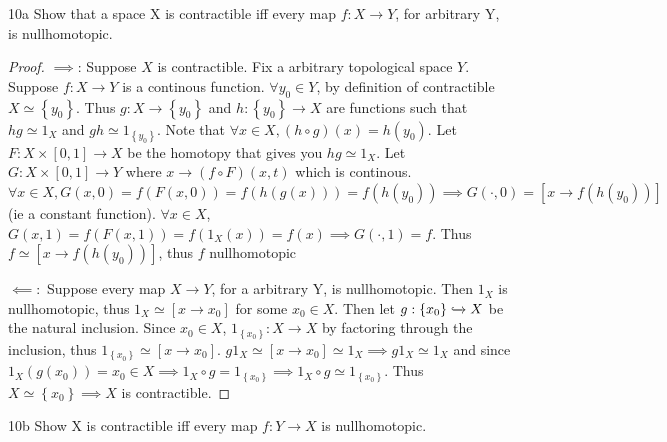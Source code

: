 \documentclass{article}
\begin{document}
\begin{claim}{10a}\label{Claim 10a.}
    Show that a space X is contractible iﬀ every map $f: X \to Y$, for arbitrary Y, is nullhomotopic.
\end{claim}
\begin{proof}
    $\implies$: Suppose $X$ is contractible. Fix a arbitrary topological space $Y$. Suppose $f: X \to Y$ is a continous function. $\forall y_0 \in Y$, by definition of contractible $X \simeq \left\{ y_0 \right\}$. Thus $g: X \to \left\{ y_0 \right\}$ and $h: \left\{ y_0 \right\} \to X$ are functions such that $hg \simeq 1_X$ and $gh \simeq 1_{\left\{ y_0 \right\}}$. Note that $\forall x \in X, (h \circ g)(x) = h(y_0)$. Let $F: X \times [0, 1] \to X$ be the homotopy that gives you $hg \simeq 1_X$. Let $G: X \times [0, 1] \to Y$ where $x \to (f \circ F)(x, t)$ which is continous. $\forall x \in X, G(x, 0) = f(F(x, 0)) = f(h(g(x))) = f(h(y_0)) \implies G(\cdot, 0) = [x \to  f(h(y_0))]$ (ie a constant function). $\forall x \in X$, $G(x, 1) = f(F(x, 1)) = f(1_X(x)) = f(x) \implies G(\cdot, 1) = f$. Thus $f \simeq [x \to  f(h(y_0))]$, thus $f$ nullhomotopic
    
    $\impliedby:$ Suppose every map $X \to Y$, for a arbitrary Y, is nullhomotopic. Then $1_X$ is nullhomotopic, thus $1_X \simeq [x \to x_0]$ for some $x_0 \in X$. Then let $g: \left\{ x_0 \right\} \xhookrightarrow{} X$ be the natural inclusion. Since $x_0 \in X$, $1_{\left\{ x_0 \right\}} : X \to X$ by factoring through the inclusion, thus $1_{\left\{ x_0 \right\}} \simeq [x \to x_0]$. $g 1_X \simeq [x \to x_0] \simeq 1_X \implies g 1_X \simeq 1_X$ and since $1_X(g(x_0)) = x_0 \in X \implies 1_X \circ g = 1_{\left\{ x_0 \right\}} \implies 1_X \circ g \simeq 1_{\left\{ x_0 \right\}}$. Thus $X \simeq \left\{ x_0 \right\} \implies X$ is contractible.        
\end{proof}
\begin{claim}{10b}\label{Claim 10b.}
    Show X is contractible iﬀ every map $f: Y \to X$ is nullhomotopic.
\end{claim}
\end{document}
